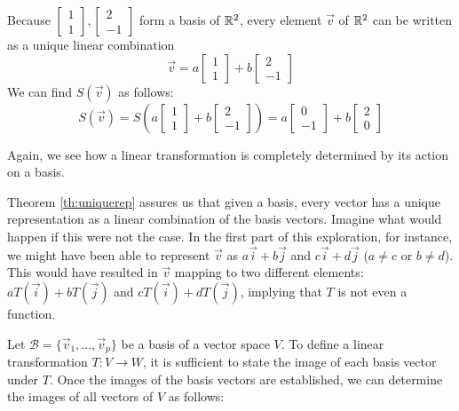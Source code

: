 \documentclass{ximera}
\begin{document}
\begin{exploration}
Because $\begin{bmatrix}1\\1\end{bmatrix},\begin{bmatrix}2\\-1\end{bmatrix}$ form a basis of $\mathbb{R}^2$, every element $\vec{v}$ of $\mathbb{R}^2$ can be written as a unique linear combination $$\vec{v}=a\begin{bmatrix}1\\1\end{bmatrix}+b\begin{bmatrix}2\\-1\end{bmatrix}$$
We can find $S(\vec{v})$ as follows:
$$S(\vec{v})=S\left(a\begin{bmatrix}1\\1\end{bmatrix}+b\begin{bmatrix}2\\-1\end{bmatrix}\right)=a\begin{bmatrix}0\\-1\end{bmatrix}+b\begin{bmatrix}2\\0\end{bmatrix}$$

Again, we see how a linear transformation is completely determined by its action on a basis.

Theorem \ref{th:uniquerep} assures us that given a basis, every vector has a unique representation as a linear combination of the basis vectors.  Imagine what would happen if this were not the case.  In the first part of this exploration, for instance, we might have been able to represent $\vec{v}$ as $a\vec{i}+b\vec{j}$ and $c\vec{i}+d\vec{j}$ ($a\neq c$ or $b\neq d$).  This would have resulted in $\vec{v}$ mapping to two different elements: $aT(\vec{i})+bT(\vec{j})$ and $cT(\vec{i})+dT(\vec{j})$, implying that $T$ is not even a function.  

\end{exploration}

Let $\mathcal{B}=\{\vec{v}_1,\ldots,\vec{v}_p\}$ be a basis of a vector space $V$.  To define a linear transformation $T:V\rightarrow W$, it is sufficient to state the image of each basis vector under $T$.  Once the images of the basis vectors are established, we can determine the images of all vectors of $V$ as follows:
\end{document}
